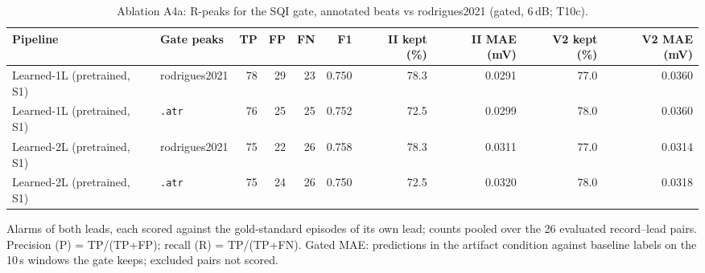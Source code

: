 \begin{table}[htbp]
\centering
\small
\caption{Ablation A4a: R-peaks for the SQI gate, annotated beats vs rodrigues2021 (gated, 6\,dB; T10c).}
\label{tab:t10_a4a}
\begin{tabular}{llrrrrrrrr}
\toprule
Pipeline & Gate peaks & TP & FP & FN & F1 & II kept (\%) & II MAE (mV) & V2 kept (\%) & V2 MAE (mV) \\
\midrule
Learned-1L (pretrained, S1) & rodrigues2021 & 78 & 29 & 23 & 0.750 & 78.3 & 0.0291 & 77.0 & 0.0360 \\
Learned-1L (pretrained, S1) & \texttt{.atr} & 76 & 25 & 25 & 0.752 & 72.5 & 0.0299 & 78.0 & 0.0360 \\
Learned-2L (pretrained, S1) & rodrigues2021 & 75 & 22 & 26 & 0.758 & 78.3 & 0.0311 & 77.0 & 0.0314 \\
Learned-2L (pretrained, S1) & \texttt{.atr} & 75 & 24 & 26 & 0.750 & 72.5 & 0.0320 & 78.0 & 0.0318 \\
\bottomrule
\end{tabular}

\par\smallskip\footnotesize Alarms of both leads, each scored against the gold-standard episodes of its own lead; counts pooled over the 26 evaluated record--lead pairs. Precision (P) = TP/(TP+FP); recall (R) = TP/(TP+FN). Gated MAE: predictions in the artifact condition against baseline labels on the 10\,s windows the gate keeps; excluded pairs not scored.
\end{table}
